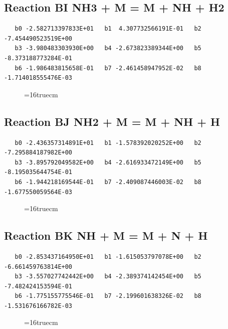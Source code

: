 \documentclass[12pt,dvipdfm]{article}
\begin{document}
\subsection{
Reaction BI NH3 + M = M + NH + H2 }
\begin{small}\begin{verbatim}
   b0 -2.582713397833E+01   b1  4.307732566191E-01   b2 -7.454490523519E+00
   b3 -3.980483303930E+00   b4 -2.673823389344E+00   b5 -8.373188773284E-01
   b6 -1.986483815658E-01   b7 -2.461458947952E-02   b8 -1.714018555476E-03
\end{verbatim}\end{small}
\begin{figure}[h!] \label{n2rates}
\epsfxsize=16truecm
\end{figure}
\newpage

\subsection{
Reaction BJ NH2 + M = M + NH + H }
\begin{small}\begin{verbatim}
   b0 -2.436357314891E+01   b1 -1.578392020252E+00   b2 -7.295884187982E+00
   b3 -3.895792049582E+00   b4 -2.616933472149E+00   b5 -8.195035644754E-01
   b6 -1.944218169544E-01   b7 -2.409087446003E-02   b8 -1.677550059564E-03
\end{verbatim}\end{small}
\begin{figure}[h!] \label{n2rates}
\epsfxsize=16truecm
\end{figure}
\newpage

\subsection{
Reaction BK NH + M = M + N + H }
\begin{small}\begin{verbatim}
   b0 -2.853437164950E+01   b1 -1.615053797078E+00   b2 -6.661459763814E+00
   b3 -3.557027742442E+00   b4 -2.389374142454E+00   b5 -7.482424153594E-01
   b6 -1.775155775546E-01   b7 -2.199601638326E-02   b8 -1.531676166782E-03
\end{verbatim}\end{small}
\begin{figure}[h!] \label{n2rates}
\epsfxsize=16truecm
\end{figure}
\newpage
\end{document}
